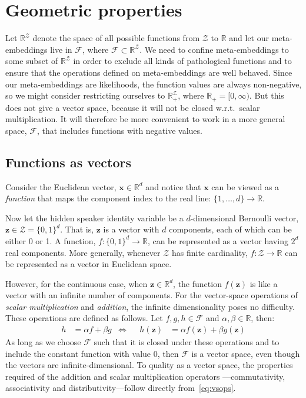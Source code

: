 \documentclass[a4paper,oneside,12pt,english]{report}
\def\zvec{\mathbf{z}}
\def\R{\mathbb{R}}
\def\Zset{\mathcal{Z}}
\def\xvec{\mathbf{x}}
\def\Zset{\mathcal{Z}}
\def\Fset{\mathcal{F}}
\begin{document}
\section{Geometric properties}
Let $\R^\Zset$ denote the space of all possible functions from $\Zset$ to $\R$ and let our meta-embeddings live in $\Fset$, where $\Fset\subset\R^{\Zset}$. We need to confine meta-embeddings to some subset of $\R^\Zset$ in order to exclude all kinds of pathological functions and to ensure that the operations defined on meta-embeddings are well behaved. Since our meta-embeddings are likelihoods, the function values are always non-negative, so we might consider restricting ourselves to $\R_+^{\Zset}$, where $\R_+ = [0,\infty)$. But this does not give a vector space, because it will not be closed w.r.t.\ scalar multiplication. It will therefore be more convenient to work in a more general space, $\Fset$, that includes functions with negative values.



\subsection{Functions as vectors}
Consider the Euclidean vector, $\xvec\in\R^d$ and notice that $\xvec$ can be viewed as a \emph{function} that maps the component index to the real line: $\{1,\ldots,d\}\to\R$. 

Now let the hidden speaker identity variable be a $d$-dimensional Bernoulli vector, $\zvec\in\Zset=\{0,1\}^d$. That is, $\zvec$ is a vector with $d$ components, each of which can be either 0 or 1. A function, $f:\{0,1\}^d\to\R$, can be represented as a vector having $2^d$ real components. More generally, whenever $\Zset$ has finite cardinality, $f:\Zset\to\R$ can be represented as a vector in Euclidean space.

However, for the continuous case, when $\zvec\in\R^d$, the function $f(\zvec)$ is like a vector with an infinite number of components. For the vector-space operations of \emph{scalar multiplication} and \emph{addition}, the infinite dimensionality poses no difficulty. These operations are defined as follows. Let $f,g,h\in\Fset$ and $\alpha,\beta\in\R$, then:
\begin{align}
\label{eq:vsops}
h &= \alpha f + \beta g & \Leftrightarrow && h(\zvec) &= \alpha f(\zvec) + \beta g(\zvec)
\end{align} 
As long as we choose $\Fset$ such that it is closed under these operations and to include the constant function with value $0$, then $\Fset$ is a vector space, even though the vectors are infinite-dimensional. To quality as a vector space, the properties required of the addition and scalar multiplication operators ---commutativity, associativity and distributivity---follow directly from~\eqref{eq:vsops}.
\end{document}
